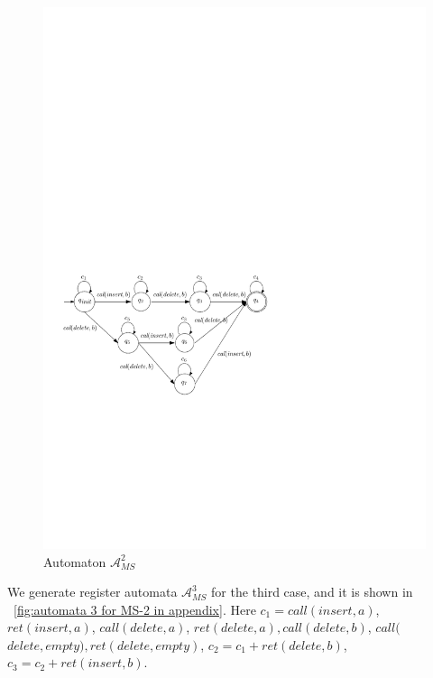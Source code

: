 {\begin{figure}[htbp]
  \centering
  \includegraphics[width=0.7 \textwidth]{figures/PIC_AUTO_MS_2.pdf}
  \caption{Automaton $\mathcal{A}_{\textit{MS}}^2$}
  \label{fig:automata 2 for MS-2 in appendix}
\end{figure}


We generate register automata $\mathcal{A}_{\textit{MS}}^3$ for the third case, and it is shown in \figurename~\ref{fig:automata 3 for MS-2 in appendix}. Here $c_1 = \textit{call}(\textit{insert},a)$, $\textit{ret}(\textit{insert},a)$, $\textit{call}(\textit{delete},a)$, $\textit{ret}(\textit{delete},a),\textit{call}(\textit{delete},b)$, $\textit{call}($ $\textit{delete},\textit{empty}),\textit{ret}(\textit{delete},\textit{empty})$, $c_2 = c_1 + \textit{ret}(\textit{delete},b)$, $c_3 = c_2 + \textit{ret}(\textit{insert},b)$.

}
